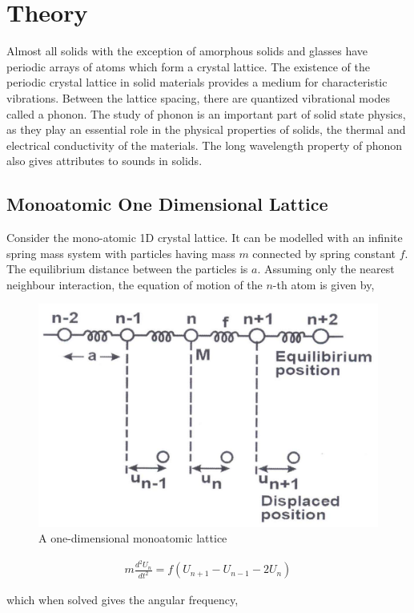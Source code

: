 \section{Theory}
Almost all solids with the exception of amorphous solids and glasses have periodic arrays of atoms which form a crystal lattice. The existence of the periodic crystal lattice in solid materials provides a medium for characteristic vibrations. Between the lattice spacing, there are quantized vibrational modes called a phonon. The study of phonon is an important part of solid state physics, as they play an essential role in the physical properties of solids, the thermal and electrical conductivity of the materials. The long wavelength property of phonon also gives attributes to sounds in solids.

\subsection{Monoatomic One Dimensional Lattice}
Consider the mono-atomic 1D crystal lattice. It can be modelled with an infinite spring mass system with particles having mass $m$ connected by spring constant $f$. The equilibrium distance between the particles is $a$. Assuming only the nearest neighbour interaction, the equation of motion of the $n$-th atom is given by,

\begin{figure}
    \centering
    \includegraphics[width=.8\columnwidth]{images/theory2.png}
    \caption{A one-dimensional monoatomic lattice}
    \label{f1}
\end{figure}

\begin{align}
    m\frac{d^2U_n}{dt^2} = f(U_{n+1}-U_{n-1} - 2U_n)
\end{align}

\noindent which when solved gives the angular frequency,

